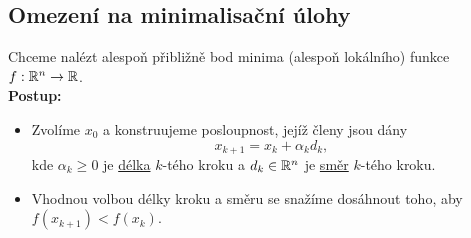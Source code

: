 
\subsection{Omezení na minimalisační úlohy}
Chceme nalézt alespoň přibližně bod minima (alespoň lokálního) funkce $f: \mathbb{R}^n \rightarrow \mathbb{R}$.\\
\textbf{Postup:}
\begin{itemize}
    \item Zvolíme $x_0$ a konstruujeme posloupnost, jejíž členy jsou dány \[ x_{k+1} = x_k + \alpha_k d_k,\] kde 
    $\alpha_k \geq 0$ je \underline{délka} $k$-tého kroku a $d_k \in \mathbb{R}^n$ je \underline{směr} $k$-tého kroku.
    \item Vhodnou volbou délky kroku a směru se snažíme dosáhnout toho, aby $f(x_{k+1}) < f(x_k)$.
\end{itemize}


